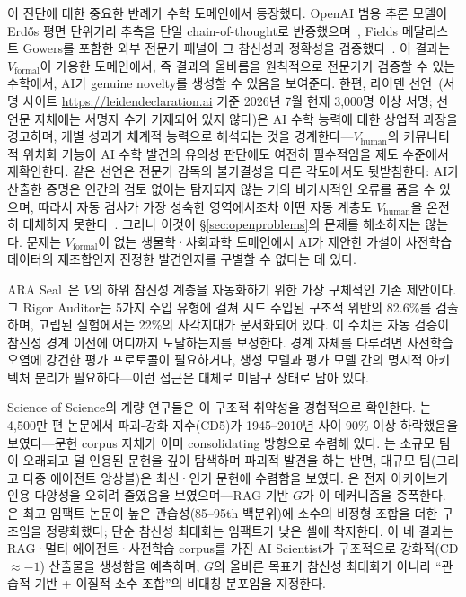 \documentclass[11pt]{article}
\begin{document}
이 진단에 대한 중요한 반례가 수학 도메인에서 등장했다. OpenAI 범용 추론 모델이 Erd\H{o}s 평면 단위거리 추측을 단일 chain-of-thought로 반증했으며~\citep{openai2026unitdistance}, Fields 메달리스트 Gowers를 포함한 외부 전문가 패널이 그 참신성과 정확성을 검증했다~\citep{alon2026unitdistanceremarks}. 이 결과는 $V_\text{formal}$이 가용한 도메인에서, 즉 결과의 올바름을 원칙적으로 전문가가 검증할 수 있는 수학에서, AI가 genuine novelty를 생성할 수 있음을 보여준다. 한편, 라이덴 선언~\citep{leidendeclaration2026}(서명 사이트 \url{https://leidendeclaration.ai} 기준 2026년 7월 현재 3,000명 이상 서명; 선언문 자체에는 서명자 수가 기재되어 있지 않다)은 AI 수학 능력에 대한 상업적 과장을 경고하며, 개별 성과가 체계적 능력으로 해석되는 것을 경계한다---$V_\text{human}$의 커뮤니티적 위치화 기능이 AI 수학 발견의 유의성 판단에도 여전히 필수적임을 제도 수준에서 재확인한다. 같은 선언은 전문가 감독의 불가결성을 다른 각도에서도 뒷받침한다: AI가 산출한 증명은 인간의 검토 없이는 탐지되지 않는 거의 비가시적인 오류를 품을 수 있으며, 따라서 자동 검사가 가장 성숙한 영역에서조차 어떤 자동 계층도 $V_\text{human}$을 온전히 대체하지 못한다~\citep{leidendeclaration2026}. 그러나 이것이 §\ref{sec:openproblems}의 문제를 해소하지는 않는다. 문제는 $V_\text{formal}$이 없는 생물학·사회과학 도메인에서 AI가 제안한 가설이 사전학습 데이터의 재조합인지 진정한 발견인지를 구별할 수 없다는 데 있다.

ARA Seal~\citep{liu2026lasthuman}은 $V$의 하위 참신성 계층을 자동화하기 위한 가장 구체적인 기존 제안이다. 그 Rigor Auditor는 5가지 주입 유형에 걸쳐 시드 주입된 구조적 위반의 82.6\%를 검출하며, 고립된 실험에서는 22\%의 사각지대가 문서화되어 있다. 이 수치는 자동 검증이 참신성 경계 이전에 어디까지 도달하는지를 보정한다. 경계 자체를 다루려면 사전학습 오염에 강건한 평가 프로토콜이 필요하거나, 생성 모델과 평가 모델 간의 명시적 아키텍처 분리가 필요하다---이런 접근은 대체로 미탐구 상태로 남아 있다.

Science of Science의 계량 연구들은 이 구조적 취약성을 경험적으로 확인한다. \citet{park2023disruptive}는 4,500만 편 논문에서 파괴-강화 지수(CD5)가 1945--2010년 사이 90\% 이상 하락했음을 보였다---문헌 corpus 자체가 이미 consolidating 방향으로 수렴해 있다. \citet{wu2019teams}는 소규모 팀이 오래되고 덜 인용된 문헌을 깊이 탐색하며 파괴적 발견을 하는 반면, 대규모 팀(그리고 다중 에이전트 앙상블)은 최신·인기 문헌에 수렴함을 보였다. \citet{evans2008narrowing}은 전자 아카이브가 인용 다양성을 오히려 줄였음을 보였으며---RAG 기반 $G$가 이 메커니즘을 증폭한다. \citet{uzzi2013atypical}은 최고 임팩트 논문이 높은 관습성(85--95th 백분위)에 소수의 비정형 조합을 더한 구조임을 정량화했다; 단순 참신성 최대화는 임팩트가 낮은 셀에 착지한다. 이 네 결과는 RAG·멀티 에이전트·사전학습 corpus를 가진 AI Scientist가 구조적으로 강화적(CD$\approx{-1}$) 산출물을 생성함을 예측하며, $G$의 올바른 목표가 참신성 최대화가 아니라 ``관습적 기반 + 이질적 소수 조합''의 비대칭 분포임을 지정한다.
\end{document}
